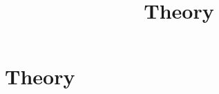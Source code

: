 \documentclass[../../OAE-SPEC-MAIN.tex]{subfiles}
\title{Theory}
\begin{document}
\chapter{Theory}















\end{document}
